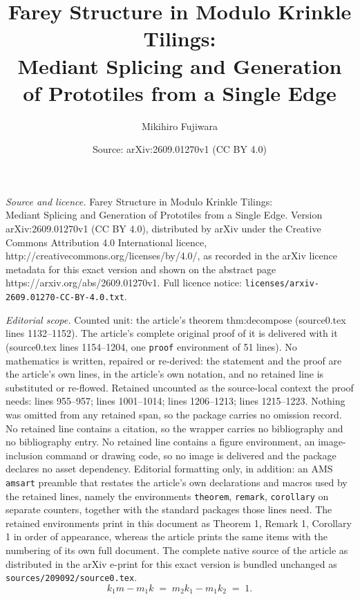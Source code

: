 \documentclass[10pt,a4paper]{amsart}
\title{Farey Structure in Modulo Krinkle Tilings:\\ Mediant Splicing and Generation of Prototiles from a Single Edge}
\author{Mikihiro Fujiwara}
\date{Source: arXiv:2609.01270v1 (CC BY 4.0)}
\begin{document}
\maketitle

\noindent\emph{Source and licence.} Farey Structure in Modulo Krinkle Tilings:\\ Mediant Splicing and Generation of Prototiles from a Single Edge. Version arXiv:2609.01270v1 (CC BY 4.0), distributed by arXiv under the Creative Commons Attribution 4.0 International licence, http://creativecommons.org/licenses/by/4.0/, as recorded in the arXiv licence metadata for this exact version and shown on the abstract page https://arxiv.org/abs/2609.01270v1. Full licence notice: \texttt{licenses/arxiv-2609.01270-CC-BY-4.0.txt}.\par\smallskip

\noindent\textit{Editorial scope.} Counted unit: the article's theorem thm:decompose (source0.tex lines 1132--1152). The article's complete original proof of it is delivered with it (source0.tex lines 1154--1204, one \texttt{proof} environment of 51 lines). No mathematics is written, repaired or re-derived: the statement and the proof are the article's own lines, in the article's own notation, and no retained line is substituted or re-flowed.  Retained uncounted as the source-local context the proof needs: lines 955--957; lines 1001--1014; lines 1206--1213; lines 1215--1223.  Nothing was omitted from any retained span, so the package carries no omission record.  No retained line contains a citation, so the wrapper carries no bibliography and no bibliography entry.  No retained line contains a figure environment, an image-inclusion command or drawing code, so no image is delivered and the package declares no asset dependency.  Editorial formatting only, in addition: an AMS \texttt{amsart} preamble that restates the article's own declarations and macros used by the retained lines, namely the environments \texttt{theorem}, \texttt{remark}, \texttt{corollary} on separate counters, together with the standard packages those lines need.  The retained environments print in this document as Theorem 1, Remark 1, Corollary 1 in order of appearance, whereas the article prints the same items with the numbering of its own full document.  The complete native source of the article as distributed in the arXiv e-print for this exact version is bundled unchanged as \texttt{sources/209092/source0.tex}.
\begin{equation}
k_1 m - m_1 k \;=\; m_2k_1-m_1k_2 \;=\; 1. \tag{$\star$}\label{eq:star}
\end{equation}
\end{document}
